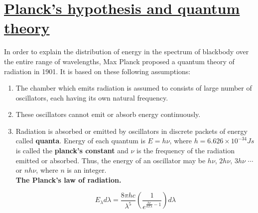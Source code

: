 \documentclass[14pt,a4paper]{article}
\begin{document}
\section{\underline{Planck's hypothesis and quantum theory}}
In order to explain the distribution of energy in the spectrum of blackbody over the entire range of wavelengths, Max Planck proposed a quantum theory of radiation in 1901. It is based on these following assumptions:
\begin{enumerate}
    \item The chamber which emits radiation is assumed to consists of large number of oscillators, each having its own natural frequency.
    \item These oscillators cannot emit or absorb energy continuously.
    \item Radiation is absorbed or emitted by oscillators in discrete packets of energy called  \textbf{quanta}. Energy of each quantum is $E = h\nu$, where $h = 6.626 \times 10^{-34} Js$ is called the \textbf{planck's constant} and $\nu$ is the frequency of the radiation emitted or absorbed. Thus, the energy of an oscillator may be $h\nu$, $2h\nu$, $3h\nu$ $\cdots$ or $nh\nu$, where $n$ is an integer.
    \\
    \textbf{The Planck's law of radiation.}
    \begin{Large}\begin{equation}
        E_{\lambda} d\lambda = \frac{8\pi hc}{\lambda^{5}} \left( \frac{1}{e^{\frac{hc} {kT \lambda} -1 } }  \right)d\lambda
    \end{equation}
    \end{Large}
\end{enumerate}
\end{document}
